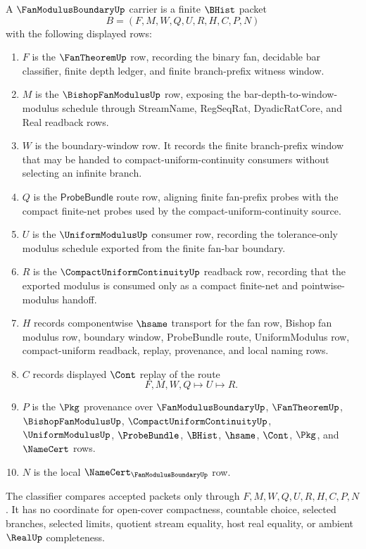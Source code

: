 \begin{definition}
\label{def:fan-modulus-boundary-carrier}
A $\FanModulusBoundaryUp$ carrier is a finite $\BHist$ packet
$$
B=(F,M,W,Q,U,R,H,C,P,N)
$$
with the following displayed rows:
\begin{enumerate}
\item $F$ is the $\FanTheoremUp$ row, recording the binary fan, decidable bar classifier, finite depth ledger, and finite branch-prefix witness window.
\item $M$ is the $\BishopFanModulusUp$ row, exposing the bar-depth-to-window-modulus schedule through StreamName, RegSeqRat, DyadicRatCore, and Real readback rows.
\item $W$ is the boundary-window row. It records the finite branch-prefix window that may be handed to compact-uniform-continuity consumers without selecting an infinite branch.
\item $Q$ is the $\mathsf{ProbeBundle}$ route row, aligning finite fan-prefix probes with the compact finite-net probes used by the compact-uniform-continuity source.
\item $U$ is the $\UniformModulusUp$ consumer row, recording the tolerance-only modulus schedule exported from the finite fan-bar boundary.
\item $R$ is the $\CompactUniformContinuityUp$ readback row, recording that the exported modulus is consumed only as a compact finite-net and pointwise-modulus handoff.
\item $H$ records componentwise $\hsame$ transport for the fan row, Bishop fan modulus row, boundary window, ProbeBundle route, UniformModulus row, compact-uniform readback, replay, provenance, and local naming rows.
\item $C$ records displayed $\Cont$ replay of the route
$$
F,M,W,Q \longmapsto U \longmapsto R .
$$
\item $P$ is the $\Pkg$ provenance over $\FanModulusBoundaryUp$, $\FanTheoremUp$, $\BishopFanModulusUp$, $\CompactUniformContinuityUp$, $\UniformModulusUp$, $\ProbeBundle$, $\BHist$, $\hsame$, $\Cont$, $\Pkg$, and $\NameCert$ rows.
\item $N$ is the local $\NameCert_{\FanModulusBoundaryUp}$ row.
\end{enumerate}
The classifier compares accepted packets only through $F,M,W,Q,U,R,H,C,P,N$. It has no coordinate for open-cover compactness, countable choice, selected branches, selected limits, quotient stream equality, host real equality, or ambient $\RealUp$ completeness.
\end{definition}

